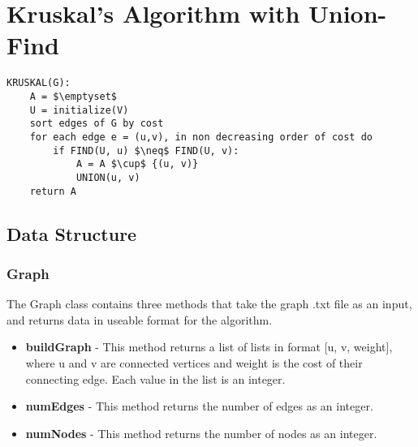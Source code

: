 \section{Kruskal's Algorithm with Union-Find}\label{kruskal_uf}

\begin{lstlisting}[mathescape=true]
KRUSKAL(G):
	A = $\emptyset$
	U = initialize(V)
	sort edges of G by cost
	for each edge e = (u,v), in non decreasing order of cost do	
		if FIND(U, u) $\neq$ FIND(U, v): 
		    A = A $\cup$ {(u, v)}
		    UNION(u, v)
	return A
\end{lstlisting}


\subsection{Data Structure}

	\subsubsection{Graph}
	The Graph class contains three methods that take the graph .txt file as an input, and returns data in useable format for the algorithm. 
	\begin{itemize}
    \item \textbf{buildGraph} - This method returns a list of lists in format [u, v, weight], where u and v are connected vertices and weight is the cost of their connecting edge. Each value in the list is an integer.  
    \item \textbf{numEdges} - This method returns the number of edges as an integer.
    \item \textbf{numNodes} - This method returns the number of nodes as an integer.
    \end{itemize}
	
